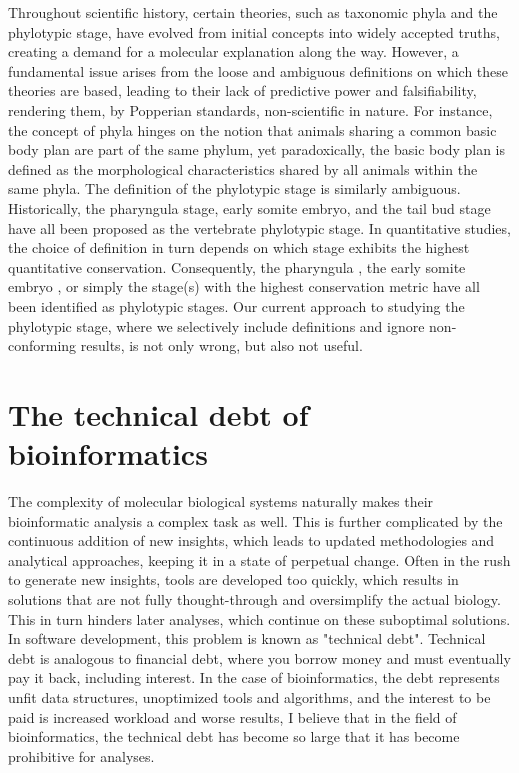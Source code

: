 Throughout scientific history, certain theories, such as taxonomic phyla and the phylotypic stage, have evolved from initial concepts into widely accepted truths, creating a demand for a molecular explanation along the way. However, a fundamental issue arises from the loose and ambiguous definitions on which these theories are based, leading to their lack of predictive power and falsifiability, rendering them, by Popperian standards, non-scientific in nature. For instance, the concept of phyla hinges on the notion that animals sharing a common basic body plan are part of the same phylum, yet paradoxically, the basic body plan is defined as the morphological characteristics shared by all animals within the same phyla\cite{BUDD2000,scholtz2004bauplane}. The definition of the phylotypic stage is similarly ambiguous. Historically, the pharyngula stage\cite{BALLARD1981}, early somite embryo\cite{Alberch1993}, and the tail bud stage \cite{Slack1993} have all been proposed as the vertebrate phylotypic stage. In quantitative studies, the choice of definition in turn depends on which stage exhibits the highest quantitative conservation. Consequently, the pharyngula \cite{Irie2011,marletaz2018}, the early somite embryo \cite{DomazetLoso2010}, or simply the stage(s) with the highest conservation metric\cite{Kalinka2010,Cordero2020} have all been identified as phylotypic stages. Our current approach to studying the phylotypic stage, where we selectively include definitions and ignore non-conforming results, is not only wrong, but also not useful.

\section{The technical debt of bioinformatics}

The complexity of molecular biological systems naturally makes their bioinformatic analysis a complex task as well. This is further complicated by the continuous addition of new insights, which leads to updated methodologies and analytical approaches, keeping it in a state of perpetual change. Often in the rush to generate new insights, tools are developed too quickly, which results in solutions that are not fully thought-through and oversimplify the actual biology. This in turn hinders later analyses, which continue on these suboptimal solutions. In software development, this problem is known as "technical debt". Technical debt is analogous to financial debt, where you borrow money and must eventually pay it back, including interest. In the case of bioinformatics, the debt represents unfit data structures, unoptimized tools and algorithms, and the interest to be paid is increased workload and worse results, I believe that in the field of bioinformatics, the technical debt has become so large that it has become prohibitive for analyses.

